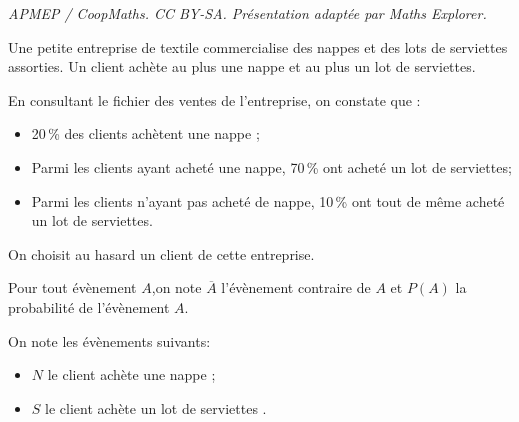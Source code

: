 \documentclass[10pt]{article}
\begin{document}
\noindent\textit{APMEP / CoopMaths. CC BY-SA. Présentation adaptée par Maths Explorer.}\par\medskip
\medskip

Une petite entreprise de textile commercialise des nappes et des lots de serviettes assorties. Un client achète au plus une nappe et au plus un lot de serviettes.

En consultant le fichier des ventes de l'entreprise, on constate que :

\setlength\parindent{9mm}
\begin{itemize}
\item[$\bullet~~$] 20\,\% des clients achètent une nappe ;
\item[$\bullet~~$] Parmi les clients ayant acheté une nappe, 70\,\% ont acheté un lot de serviettes;
\item[$\bullet~~$] Parmi les clients n'ayant pas acheté de nappe, 10\,\% ont tout de même acheté un lot de serviettes.
\end{itemize}
\setlength\parindent{0mm}

\smallskip

On choisit au hasard un client de cette entreprise.

 
Pour tout évènement $A$,on note $\overline{A}$ l'évènement contraire de $A$ et $P(A)$ la probabilité de l'évènement $A$.
 
On note les évènements suivants:

\setlength\parindent{9mm}
\begin{itemize}
\item[$\bullet~~$]$N$ \og le client achète une nappe \fg{} ;
\item[$\bullet~~$]$S$ \og le client achète un lot de serviettes \fg.
\end{itemize}
\setlength\parindent{0mm}

\medskip
\end{document}

